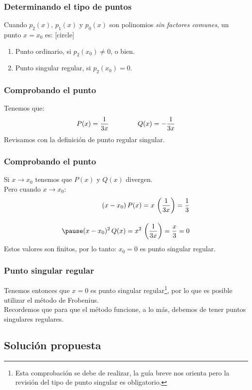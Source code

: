 \documentclass[12pt]{beamer}
\begin{document}
\begin{frame}
\frametitle{Determinando el tipo de puntos}
Cuando $p_{2}(x)$, $p_{1}(x)$ y $p_{0}(x)$ son polinomios \emph{sin factores comunes}, un punto $x = x_{0}$ es:
[circle]
\begin{enumerate}[<+->]
\item Punto ordinario, si $p_{2}(x_{0}) \neq 0$, o bien.
\item Punto singular regular,  si $p_{2}(x_{0}) = 0$.
\end{enumerate}
\end{frame}
\begin{frame}
\frametitle{Comprobando el punto }
Tenemos que:
\begin{align*}
P(x) = \dfrac{1}{3 x} \hspace{1.5cm} Q(x) = -\dfrac{1}{3 x}
\end{align*}
\pause
Revisamos con la definición de punto regular singular.
\end{frame}
\begin{frame}
\frametitle{Comprobando el punto}
Si $x \to x_{0}$ tenemos que $P(x)$ y $Q(x)$ divergen.
\\
\bigskip
\pause
Pero cuando $x \to x_{0}$:
\begin{eqnarray*}
(x - x_{0}) \, P(x) = x \, \left( \dfrac{1}{3 x} \right) = \dfrac{1}{3} \\[1em] \pause
(x - x_{0})^{2} \, Q(x) = x^{2} \, \left( \dfrac{1}{3 x} \right) = \dfrac{x}{3} = 0
\end{eqnarray*}
\pause
Estos valores son finitos, por lo tanto: $x_{0} = 0$ es punto singular regular.
\end{frame}
\begin{frame}
\frametitle{Punto singular regular}
Tenemos entonces que $x = 0$ es punto singular regular\footnote{Esta comprobación se debe de realizar, la guía breve nos orienta pero la revisión del tipo de punto singular es obligatorio.}, por lo que es posible utilizar el método de Frobenius.
\\
\bigskip
\pause
Recordemos que para que el método funcione, a lo más, debemos de tener puntos singulares regulares.
\end{frame}

\subsection*{Solución propuesta}
\end{document}
